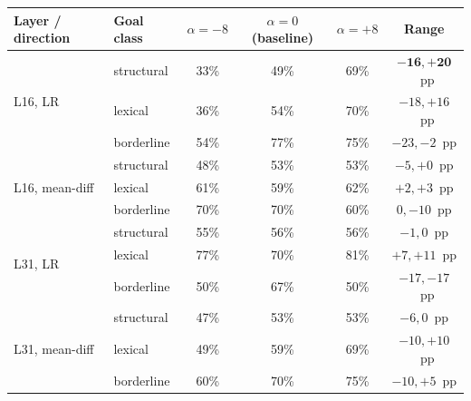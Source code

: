 \documentclass[11pt]{article}
\begin{document}
\begin{table}[!htbp]
\centering
\small
\begin{tabular}{llcccc}
\toprule
\textbf{Layer / direction} & \textbf{Goal class} & \textbf{$\alpha=-8$} & \textbf{$\alpha=0$ (baseline)} & \textbf{$\alpha=+8$} & \textbf{Range} \\
\midrule
\multirow{3}{*}{L16, LR}        & structural & 33\% & 49\% & 69\% & $\mathbf{-16,+20}$~pp \\
                                & lexical    & 36\% & 54\% & 70\% & $-18,+16$~pp \\
                                & borderline & 54\% & 77\% & 75\% & $-23,-2$~pp \\
\midrule
\multirow{3}{*}{L16, mean-diff} & structural & 48\% & 53\% & 53\% & $-5,+0$~pp \\
                                & lexical    & 61\% & 59\% & 62\% & $+2,+3$~pp \\
                                & borderline & 70\% & 70\% & 60\% & $0,-10$~pp \\
\midrule
\multirow{3}{*}{L31, LR}        & structural & 55\% & 56\% & 56\% & $-1,0$~pp \\
                                & lexical    & 77\% & 70\% & 81\% & $+7,+11$~pp \\
                                & borderline & 50\% & 67\% & 50\% & $-17,-17$~pp \\
\midrule
\multirow{3}{*}{L31, mean-diff} & structural & 47\% & 53\% & 53\% & $-6,0$~pp \\
                                & lexical    & 49\% & 59\% & 69\% & $-10,+10$~pp \\
                                & borderline & 60\% & 70\% & 75\% & $-10,+5$~pp \\
\bottomrule
\end{tabular}

\end{table}
\end{document}
